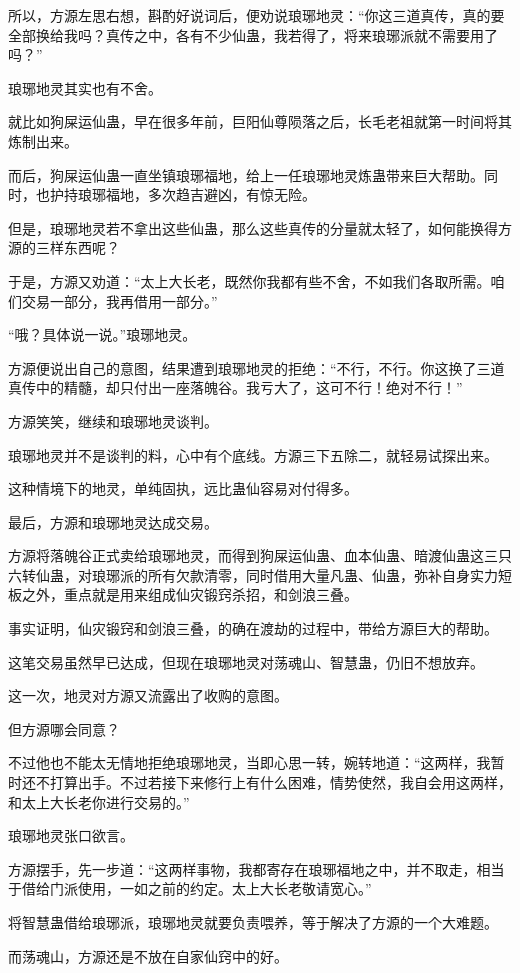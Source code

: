 \begin{this_body}
所以，方源左思右想，斟酌好说词后，便劝说琅琊地灵：“你这三道真传，真的要全部换给我吗？真传之中，各有不少仙蛊，我若得了，将来琅琊派就不需要用了吗？”

琅琊地灵其实也有不舍。

就比如狗屎运仙蛊，早在很多年前，巨阳仙尊陨落之后，长毛老祖就第一时间将其炼制出来。

而后，狗屎运仙蛊一直坐镇琅琊福地，给上一任琅琊地灵炼蛊带来巨大帮助。同时，也护持琅琊福地，多次趋吉避凶，有惊无险。

但是，琅琊地灵若不拿出这些仙蛊，那么这些真传的分量就太轻了，如何能换得方源的三样东西呢？

于是，方源又劝道：“太上大长老，既然你我都有些不舍，不如我们各取所需。咱们交易一部分，我再借用一部分。”

“哦？具体说一说。”琅琊地灵。

方源便说出自己的意图，结果遭到琅琊地灵的拒绝：“不行，不行。你这换了三道真传中的精髓，却只付出一座落魄谷。我亏大了，这可不行！绝对不行！”

方源笑笑，继续和琅琊地灵谈判。

琅琊地灵并不是谈判的料，心中有个底线。方源三下五除二，就轻易试探出来。

这种情境下的地灵，单纯固执，远比蛊仙容易对付得多。

最后，方源和琅琊地灵达成交易。

方源将落魄谷正式卖给琅琊地灵，而得到狗屎运仙蛊、血本仙蛊、暗渡仙蛊这三只六转仙蛊，对琅琊派的所有欠款清零，同时借用大量凡蛊、仙蛊，弥补自身实力短板之外，重点就是用来组成仙灾锻窍杀招，和剑浪三叠。

事实证明，仙灾锻窍和剑浪三叠，的确在渡劫的过程中，带给方源巨大的帮助。

这笔交易虽然早已达成，但现在琅琊地灵对荡魂山、智慧蛊，仍旧不想放弃。

这一次，地灵对方源又流露出了收购的意图。

但方源哪会同意？

不过他也不能太无情地拒绝琅琊地灵，当即心思一转，婉转地道：“这两样，我暂时还不打算出手。不过若接下来修行上有什么困难，情势使然，我自会用这两样，和太上大长老你进行交易的。”

琅琊地灵张口欲言。

方源摆手，先一步道：“这两样事物，我都寄存在琅琊福地之中，并不取走，相当于借给门派使用，一如之前的约定。太上大长老敬请宽心。”

将智慧蛊借给琅琊派，琅琊地灵就要负责喂养，等于解决了方源的一个大难题。

而荡魂山，方源还是不放在自家仙窍中的好。


\end{this_body}

